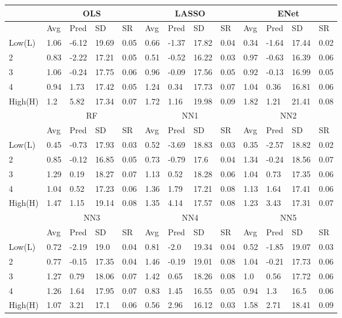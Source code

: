 \begin{tabularx}{\linewidth}{*{13}{X}}
 & \multicolumn{4}{c}{OLS} & \multicolumn{4}{c}{LASSO} & \multicolumn{4}{c}{ENet}\\
\hline
& Avg & Pred & SD & SR & Avg & Pred & SD & SR & Avg & Pred & SD & SR \\
\hline
Low(L)& 1.06& -6.12& 19.69& 0.05& 0.66& -1.37& 17.82& 0.04& 0.34& -1.64& 17.44& 0.02\\
2& 0.83& -2.22& 17.21& 0.05& 0.51& -0.52& 16.22& 0.03& 0.97& -0.63& 16.39& 0.06\\
3& 1.06& -0.24& 17.75& 0.06& 0.96& -0.09& 17.56& 0.05& 0.92& -0.13& 16.99& 0.05\\
4& 0.94& 1.73& 17.42& 0.05& 1.24& 0.34& 17.73& 0.07& 1.04& 0.36& 16.81& 0.06\\
High(H)& 1.2& 5.82& 17.34& 0.07& 1.72& 1.16& 19.98& 0.09& 1.82& 1.21& 21.41& 0.08\\
\hline
 & \multicolumn{4}{c}{RF} & \multicolumn{4}{c}{NN1} & \multicolumn{4}{c}{NN2}\\
\hline
& Avg & Pred & SD & SR & Avg & Pred & SD & SR & Avg & Pred & SD & SR \\
\hline
Low(L)& 0.45& -0.73& 17.93& 0.03& 0.52& -3.69& 18.83& 0.03& 0.35& -2.57& 18.82& 0.02\\
2& 0.85& -0.12& 16.85& 0.05& 0.73& -0.79& 17.6& 0.04& 1.34& -0.24& 18.56& 0.07\\
3& 1.29& 0.19& 18.27& 0.07& 1.13& 0.52& 18.28& 0.06& 1.04& 0.73& 17.35& 0.06\\
4& 1.04& 0.52& 17.23& 0.06& 1.36& 1.79& 17.21& 0.08& 1.13& 1.64& 17.41& 0.06\\
High(H)& 1.47& 1.15& 19.14& 0.08& 1.35& 4.14& 17.57& 0.08& 1.23& 3.43& 17.31& 0.07\\
\hline
 & \multicolumn{4}{c}{NN3} & \multicolumn{4}{c}{NN4} & \multicolumn{4}{c}{NN5}\\
\hline
& Avg & Pred & SD & SR & Avg & Pred & SD & SR & Avg & Pred & SD & SR \\
\hline
Low(L)& 0.72& -2.19& 19.0& 0.04& 0.81& -2.0& 19.34& 0.04& 0.52& -1.85& 19.07& 0.03\\
2& 0.77& -0.15& 17.35& 0.04& 1.46& -0.19& 19.01& 0.08& 1.04& -0.21& 17.73& 0.06\\
3& 1.27& 0.79& 18.06& 0.07& 1.42& 0.65& 18.26& 0.08& 1.0& 0.56& 17.72& 0.06\\
4& 1.26& 1.64& 17.95& 0.07& 0.83& 1.45& 16.55& 0.05& 0.94& 1.3& 16.5& 0.06\\
High(H)& 1.07& 3.21& 17.1& 0.06& 0.56& 2.96& 16.12& 0.03& 1.58& 2.71& 18.41& 0.09\\
\hline
\end{tabularx}